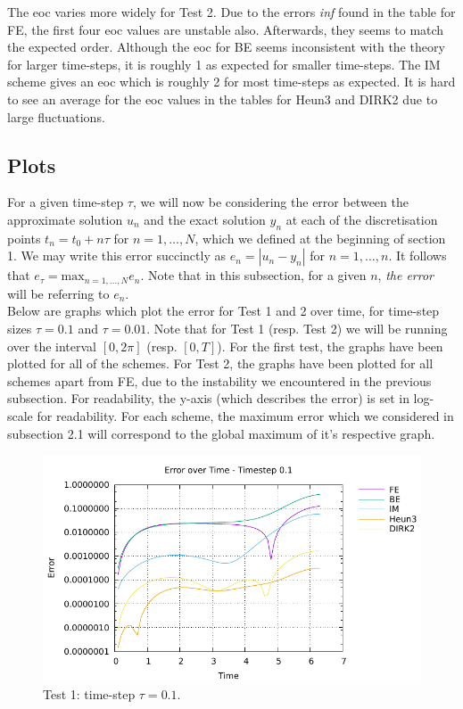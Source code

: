 \documentclass[10pt]{article}
\begin{document}
The eoc varies more widely for Test 2. Due to the errors \textit{inf} found in the table for FE, the first four eoc values are unstable also. Afterwards, they seems to match the expected order. Although the eoc for BE seems inconsistent with the theory for larger time-steps, it is roughly 1 as expected for smaller time-steps. The IM scheme gives an eoc which is roughly 2 for most time-steps as expected. It is hard to see an average for the eoc values in the tables for Heun3 and DIRK2 due to large fluctuations.

\subsection{Plots}

For a given time-step $\tau$, we will now be considering the error between the approximate solution $u_n$ and the exact solution $y_n$ at each of the discretisation points $t_n = t_0 + n\tau $ for $n=1, \dots , N$, which we defined at the beginning of section 1. We may write this error succinctly as $e_n = |u_n-y_n|$ for $n = 1,\dots,n$. It follows that $e_\tau = \text{max}_{n=1,\dots,N}e_n$. Note that in this subsection, for a given $n$, \textit{the error} will be referring to $e_n$. \\

Below are graphs which plot the error for Test 1 and 2 over time, for time-step sizes $\tau = 0.1$ and $\tau = 0.01$. Note that for Test 1 (resp. Test 2) we will be running over the interval $[0,2\pi]$ (resp. $[0,T]$). For the first test, the graphs have been plotted for all of the schemes. For Test 2, the graphs have been plotted for all schemes apart from FE, due to the instability we encountered in the previous subsection. For readability, the y-axis (which describes the error) is set in log-scale for readability. For each scheme, the maximum error which we considered in subsection 2.1 will correspond to the global maximum of it's respective graph.

 \begin{figure}[H]
 \begin{center}
    \includegraphics[width=1\textwidth]{plot1_01.pdf}
  \end{center}
  \caption{Test 1: time-step $\tau = 0.1$.
  \label{fig: 1_01}}
\end{figure}
\end{document}
